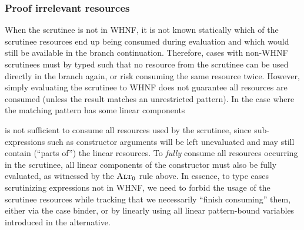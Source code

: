 \documentclass[acmsmall,review,anonymous,screen]{acmart}
\newcommand{\ccase}[2]{\mathsf{case}~#1~\mathsf{of}~#2}
\begin{document}


\subsubsection{Proof irrelevant resources}

When the scrutinee is not in WHNF, it is not known statically which of the
scrutinee resources end up being consumed during evaluation and which would
still be available in the branch continuation.
%
Therefore, cases with non-WHNF scrutinees must by typed such that no resource
from the scrutinee can be used directly in the branch again, or risk
consuming the same resource twice.
%
However, simply evaluating the scrutinee to WHNF does not guarantee all
resources are consumed (unless the result matches an unrestricted pattern).
In the case where the matching pattern has some linear components

is not sufficient to
consume all resources used by the scrutinee, since sub-expressions such
as constructor arguments will be left unevaluated and may still contain
(``parts of'') the linear resources. To \emph{fully} consume all
resources occurring in the scrutinee, all linear components of the
constructor must also be fully evaluated, as witnessed by the
$\textsc{Alt}_0$ rule above.
%
In essence, to type cases scrutinizing expressions not in WHNF, we need to
forbid the usage of the scrutinee resources while tracking that we necessarily
``finish consuming'' them, either via the case binder, or by linearly using all
linear pattern-bound variables introduced in the alternative.

\end{document}
